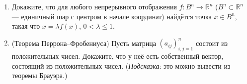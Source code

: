 \documentclass[12pt]{article}
\renewcommand{\le}{\leqslant}
\def\RR{\mathbb{R}}
\begin{document}
\begin{enumerate}
  \item Докажите, что для любого непрерывного отображения $f : B^n \to \mathbb{R}^n$ ($B^n \subset \mathbb{R}^n$ --- единичный шар с центром в начале координат) найдётся точка $x \in B^n$, такая что $x = \lambda f(x)$, $0 < \lambda \le 1$.


  \item (Теорема Перрона--Фробениуса) Пусть матрица $(a_{ij})_{i,j=1}^n$ состоит из положительных чисел. Докажите, что у неё есть собственный вектор, состоящий из положительных чисел.
  (\emph{Подсказка}: это можно вывести из теоремы Брауэра.)

%



%

%


\end{enumerate}
\end{document}

